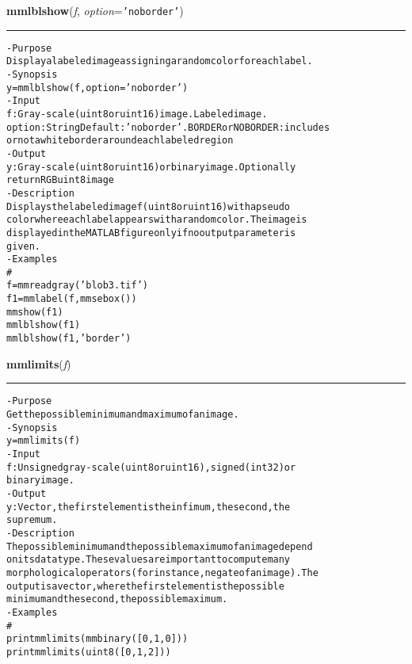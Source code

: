     \begin{boxedminipage}{\textwidth}

    \raggedright \textbf{mmlblshow}(\textit{f}, \textit{option}=\texttt{'\-n\-o\-b\-o\-r\-d\-e\-r\-'\-})

    \vspace{-1.5ex}

    \rule{\textwidth}{0.5\fboxrule}
\begin{alltt}
- Purpose
    Display a labeled image assigning a random color for each label.
- Synopsis
    y = mmlblshow(f, option='noborder')
- Input
    f:      Gray-scale (uint8 or uint16) image. Labeled image.
    option: String Default: 'noborder'. BORDER or NOBORDER: includes
            or not a white border around each labeled region
- Output
    y: Gray-scale (uint8 or uint16) or binary image. Optionally
       return RGB uint8 image
- Description
    Displays the labeled image f (uint8 or uint16) with a pseudo
    color where each label appears with a random color. The image is
    displayed in the MATLAB figure only if no output parameter is
    given.
- Examples
    \#
    f=mmreadgray('blob3.tif')
    f1=mmlabel(f,mmsebox())
    mmshow(f1)
    mmlblshow(f1)
    mmlblshow(f1,'border')\end{alltt}

    \vspace{1ex}

    \end{boxedminipage}

    \label{multireg:num_pymorph:mmlimits}
    \vspace{0.5ex}

    \begin{boxedminipage}{\textwidth}

    \raggedright \textbf{mmlimits}(\textit{f})

    \vspace{-1.5ex}

    \rule{\textwidth}{0.5\fboxrule}
\begin{alltt}
- Purpose
    Get the possible minimum and maximum of an image.
- Synopsis
    y = mmlimits(f)
- Input
    f: Unsigned gray-scale (uint8 or uint16), signed (int32) or
       binary image.
- Output
    y: Vector, the first element is the infimum, the second, the
       supremum.
- Description
    The possible minimum and the possible maximum of an image depend
    on its data type. These values are important to compute many
    morphological operators (for instance, negate of an image). The
    output is a vector, where the first element is the possible
    minimum and the second, the possible maximum.
- Examples
    \#
    print mmlimits(mmbinary([0, 1, 0]))
    print mmlimits(uint8([0, 1, 2]))\end{alltt}

    \vspace{1ex}

    \end{boxedminipage}

